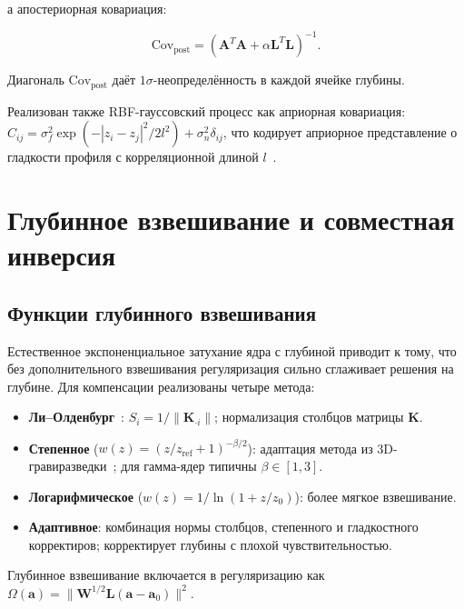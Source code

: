 \documentclass[12pt,a4paper]{article}
\newcommand{\va}{\mathbf{a}}
\newcommand{\mK}{\mathbf{K}}
\newcommand{\mA}{\mathbf{A}}
\newcommand{\mL}{\mathbf{L}}
\newcommand{\mW}{\mathbf{W}}
\begin{document}
а апостериорная ковариация:

\begin{equation}
  \mathrm{Cov}_{\mathrm{post}} = (\mA^T\mA + \alpha\mL^T\mL)^{-1}.
  \label{eq:post_cov}
\end{equation}

Диагональ $\mathrm{Cov}_{\mathrm{post}}$ даёт $1\sigma$-неопределённость
в каждой ячейке глубины.

Реализован также RBF-гауссовский процесс как априорная ковариация:
$C_{ij} = \sigma_f^2 \exp(-|z_i - z_j|^2 / 2l^2) + \sigma_n^2 \delta_{ij}$,
что кодирует априорное представление о гладкости профиля
с корреляционной длиной $l$~\citep{Hasan2023}.


\section{Глубинное взвешивание и совместная инверсия}
\label{sec:geophysics}

\subsection{Функции глубинного взвешивания}
\label{sub:depth_weight}

Естественное экспоненциальное затухание ядра с глубиной приводит
к тому, что без дополнительного взвешивания регуляризация
сильно сглаживает решения на глубине.
Для компенсации реализованы четыре метода:

\begin{itemize}[leftmargin=*,itemsep=2pt]
  \item \textbf{Ли--Олденбург}~\citep{LiOldenburg1996}:
        $S_i = 1/\|\mK_{\cdot i}\|$; нормализация столбцов матрицы $\mK$.
  \item \textbf{Степенное} ($w(z) = (z/z_{\mathrm{ref}} + 1)^{-\beta/2}$):
        адаптация метода из 3D-гравиразведки~\citep{LiOldenburg1998};
        для гамма-ядер типичны $\beta \in [1, 3]$.
  \item \textbf{Логарифмическое} ($w(z) = 1/\ln(1 + z/z_0)$):
        более мягкое взвешивание.
  \item \textbf{Адаптивное}: комбинация нормы столбцов, степенного
        и гладкостного корректиров; корректирует глубины
        с плохой чувствительностью.
\end{itemize}

Глубинное взвешивание включается в регуляризацию как
$\Omega(\va) = \|\mW^{1/2}\mL(\va - \va_0)\|^2$.
\end{document}
